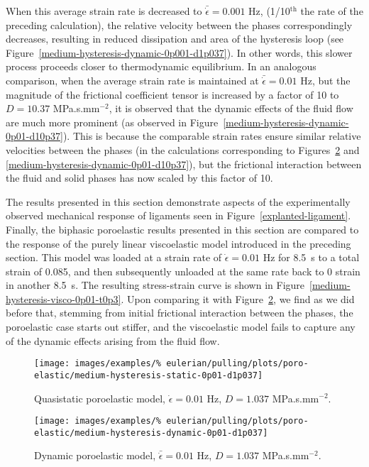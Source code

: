 When this average strain rate is decreased to $\bar{\dot{\epsilon}} =
0.001$ Hz, (1/10$^\mathrm{th}$ the rate of the preceding calculation),
the relative velocity between the phases correspondingly decreases,
resulting in reduced dissipation and area of the hysteresis loop
(see Figure~\ref{medium-hysteresis-dynamic-0p001-d1p037}). In other
words, this slower process proceeds closer to thermodynamic
equilibrium. In an analogous comparison, when the average strain rate
is maintained at $\bar{\dot{\epsilon}} = 0.01$ Hz, but the magnitude
of the frictional coefficient tensor is increased by a factor of 10 to
$D=10.37$ MPa.s.mm$^{-2}$, it is observed that the dynamic effects of
the fluid flow are much more prominent (as observed in
Figure~\ref{medium-hysteresis-dynamic-0p01-d10p37}). This is because
the comparable strain rates ensure similar relative velocities between
the phases (in the calculations corresponding to
Figures~\ref{medium-hysteresis-dynamic-0p01-d1p037} and
\ref{medium-hysteresis-dynamic-0p01-d10p37}), but the frictional
interaction between the fluid and solid phases has now scaled by this
factor of 10.

The results presented in this section demonstrate aspects of the
experimentally observed mechanical response of ligaments seen in
Figure~\ref{explanted-ligament}. Finally, the biphasic poroelastic
results presented in this section are compared to the response of the
purely linear viscoelastic model introduced in the preceding
section. This model was loaded at a strain rate of
$\dot{\epsilon}=0.01$ Hz for 8.5~s to a total strain of 0.085, and
then subsequently unloaded at the same rate back to 0 strain in
another 8.5~s. The resulting stress-strain curve is shown in
Figure~\ref{medium-hysteresis-visco-0p01-t0p3}. Upon comparing it with
Figure~\ref{medium-hysteresis-dynamic-0p01-d1p037}, we find as we did
before that, stemming from initial frictional interaction between the
phases, the poroelastic case starts out stiffer, and the viscoelastic
model fails to capture any of the dynamic effects arising from the
fluid flow.

\begin{figure}[!hptb]
\centering
\texttt{[image: images/examples/\%
eulerian/pulling/plots/poro-elastic/medium-hysteresis-static-0p01-d1p037]}
\caption{Quasistatic poroelastic model, $\dot{\epsilon}=0.01$ Hz, $D=1.037$
  MPa.s.mm$^{-2}$.}
\label{medium-hysteresis-static-0p01-d1p037}
\end{figure}

\begin{figure}[!hptb]
\centering
\texttt{[image: images/examples/\%
eulerian/pulling/plots/poro-elastic/medium-hysteresis-dynamic-0p01-d1p037]}
\caption{Dynamic poroelastic model, $\bar{\dot{\epsilon}}=0.01$ Hz,
  $D=1.037$ MPa.s.mm$^{-2}$.}
\label{medium-hysteresis-dynamic-0p01-d1p037}
\end{figure}

